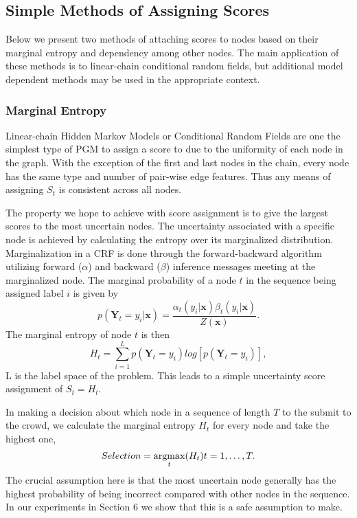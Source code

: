 \subsection{Simple Methods of Assigning Scores}
Below we present two methods of attaching scores to nodes based on their marginal entropy and dependency among other nodes.  The main application of these methods is to linear-chain conditional random fields, but additional model dependent methods may be used in the appropriate context.  

\subsubsection{Marginal Entropy}
Linear-chain Hidden Markov Models or Conditional Random Fields are one the simplest type of PGM to assign a score to due to the uniformity of each node in the graph.  With the exception of the first and last nodes in the chain, every node has the same type and number of pair-wise edge features.  Thus any means of assigning $S_{t}$ is consistent across all nodes.

The property we hope to achieve with score assignment is to give the largest scores to the most uncertain nodes.  The uncertainty associated with a specific node is achieved by calculating the entropy over its marginalized distribution.  Marginalization in a CRF is done through the forward-backward algorithm \cite{Lafferty01} utilizing forward ($\alpha$) and backward ($\beta$) inference messages meeting at the marginalized node.  The marginal probability of a node $t$ in the sequence being assigned label $i$ is given by
\begin{equation}
p(\mathbf{Y}_{t}=y_{i}|\mathbf{x}) = \frac{\alpha_{t}(y_{i}|\mathbf{x})\beta_{t}(y_{i}|\mathbf{x})}{Z(\mathbf{x})}.
\end{equation}
The marginal entropy of node $t$ is then
\begin{equation}
H_{t} = \sum_{i=1}^{L}p(\mathbf{Y}_{t} = y_{i})log[p(\mathbf{Y}_{t} = y_{i})],
\end{equation}
L is the label space of the problem.  This leads to a simple uncertainty score assignment of $S_{t}=H_{t}$.

In making a decision about which node in a sequence of length $T$ to the submit to the crowd, we calculate the marginal entropy $H_{t}$ for every node and take the highest one,
\begin{equation}
Selection = \argmax_{t}(H_{t}) t=1,\dots,T.
\end{equation}
The crucial assumption here is that the most uncertain node generally has the highest probability of being incorrect compared with other nodes in the sequence.  In our experiments in Section 6 we show that this is a safe assumption to make.  


